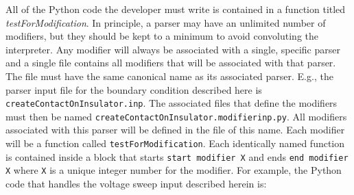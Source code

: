 All of the Python code the developer must write is contained in a
function titled {\em testForModification}.  In principle, a parser may
have an unlimited number of modifiers, but they should be kept to a
minimum to avoid convoluting the interpreter.  Any modifier will
always be associated with a single, specific parser and a single file
contains all modifiers that will be associated with that parser.  The
file must have the same canonical name as its associated parser. E.g.,
the parser input file for the boundary condition described here is
{\texttt{createContactOnInsulator.inp}}.  The associated files that
define the modifiers must then be named
\texttt{createContactOnInsulator.modifierinp.py}. All modifiers
associated with this parser will be defined in the file of this name.
Each modifier will be a function called \texttt{testForModification}.
Each identically named function is contained inside a block that
starts \texttt{start modifier X} and ends \texttt{end modifier X}
where \texttt{X} is a unique integer number for the modifier.  For
example, the Python code that handles the voltage sweep input
described herein is:
